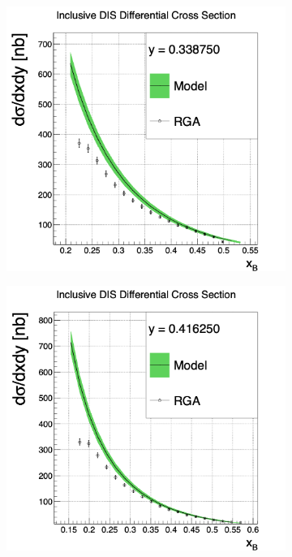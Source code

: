 \begin{figure}[h!]
	\centering
	\begin{subfigure}[b]{0.38\linewidth}
		\includegraphics[width=\linewidth]{figures/rga/xsec_0.png}
		\label{fig:rga_xsec0}
	\end{subfigure}
	\begin{subfigure}[b]{0.38\textwidth}
		\includegraphics[width=\linewidth]{figures/rga/xsec_1.png}
		\label{fig:rga_xsec1}
	\end{subfigure}
\end{figure}
